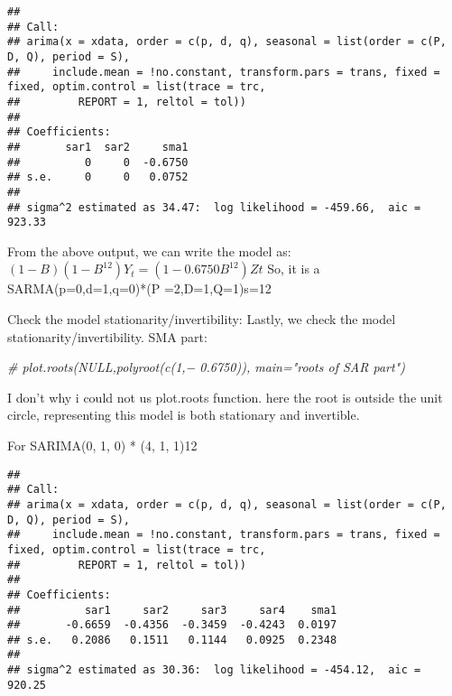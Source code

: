 \documentclass[
]{article}
\newenvironment{Shaded}{\begin{snugshade}}{\end{snugshade}}
\newcommand{\AttributeTok}[1]{\textcolor[rgb]{0.13,0.29,0.53}{#1}}
\newcommand{\CommentTok}[1]{\textcolor[rgb]{0.56,0.35,0.01}{\textit{#1}}}
\newcommand{\DecValTok}[1]{\textcolor[rgb]{0.00,0.00,0.81}{#1}}
\newcommand{\FunctionTok}[1]{\textcolor[rgb]{0.13,0.29,0.53}{\textbf{#1}}}
\newcommand{\NormalTok}[1]{#1}
\newcommand{\OtherTok}[1]{\textcolor[rgb]{0.56,0.35,0.01}{#1}}
\newcommand{\SpecialCharTok}[1]{\textcolor[rgb]{0.81,0.36,0.00}{\textbf{#1}}}
\begin{document}
\begin{verbatim}
## 
## Call:
## arima(x = xdata, order = c(p, d, q), seasonal = list(order = c(P, D, Q), period = S), 
##     include.mean = !no.constant, transform.pars = trans, fixed = fixed, optim.control = list(trace = trc, 
##         REPORT = 1, reltol = tol))
## 
## Coefficients:
##       sar1  sar2     sma1
##          0     0  -0.6750
## s.e.     0     0   0.0752
## 
## sigma^2 estimated as 34.47:  log likelihood = -459.66,  aic = 923.33
\end{verbatim}

From the above output, we can write the model as:
\((1 − B)(1 − B^{12})Y_t = (1 − 0.6750B^{12})Zt\) So, it is a
SARMA(p=0,d=1,q=0)*(P =2,D=1,Q=1)s=12

Check the model stationarity/invertibility: Lastly, we check the model
stationarity/invertibility. SMA part:

\begin{Shaded}
\begin{Highlighting}[]
\CommentTok{\# plot.roots(NULL,polyroot(c(1,− 0.6750)), main="roots of SAR part")}
\end{Highlighting}
\end{Shaded}

I don't why i could not us plot.roots function. here the root is outside
the unit circle, representing this model is both stationary and
invertible.

For SARIMA(0, 1, 0) * (4, 1, 1)12

\begin{Shaded}
\end{Shaded}

\begin{verbatim}
## 
## Call:
## arima(x = xdata, order = c(p, d, q), seasonal = list(order = c(P, D, Q), period = S), 
##     include.mean = !no.constant, transform.pars = trans, fixed = fixed, optim.control = list(trace = trc, 
##         REPORT = 1, reltol = tol))
## 
## Coefficients:
##          sar1     sar2     sar3     sar4    sma1
##       -0.6659  -0.4356  -0.3459  -0.4243  0.0197
## s.e.   0.2086   0.1511   0.1144   0.0925  0.2348
## 
## sigma^2 estimated as 30.36:  log likelihood = -454.12,  aic = 920.25
\end{verbatim}
\end{document}
